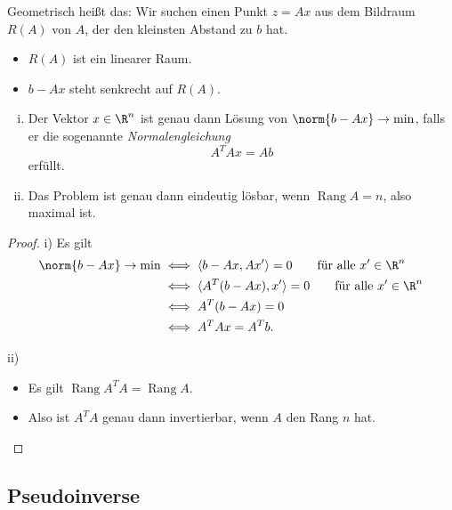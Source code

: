 \bigskip

Geometrisch heißt das: Wir suchen einen Punkt $z=Ax$ aus dem Bildraum $R(A)$ von $A$,
der den kleinsten Abstand zu $b$ hat.


\begin{itemize}
 \item $R(A)$ ist ein linearer Raum.
 \item $b-Ax$ steht senkrecht auf $R(A)$.
\end{itemize}

\begin{satz}
 \begin{enumerate}[i)]
 \item Der Vektor $x \in \R^n$ ist genau dann Lösung von $\norm{b-Ax} \to \min$, falls er die
 sogenannte \emph{Normalengleichung}
 \begin{equation*}
  A^TAx = Ab
 \end{equation*}
 erfüllt.

 \item Das Problem ist genau dann eindeutig lösbar, wenn $\operatorname{Rang} A = n$, also maximal ist.
 \end{enumerate}
\end{satz}

\begin{proof}
 i)  Es gilt
 \begin{align*}
  \norm{b-Ax} \to \min
  & \iff
  \langle b-Ax, Ax'\rangle = 0 \qquad \text{für alle $x' \in \R^n$} \\
  & \iff
  \langle A^T(b-Ax), x'\rangle = 0 \qquad \text{für alle $x' \in \R^n$} \\
  & \iff
  A^T(b-Ax) = 0 \\
  & \iff
  A^TAx = A^Tb.
 \end{align*}

 ii)
 \begin{itemize}
  \item Es gilt $\operatorname{Rang} A^T A = \operatorname{Rang} A$.
  \item Also ist $A^TA$ genau dann invertierbar, wenn $A$ den Rang $n$ hat.
  \qedhere
 \end{itemize}

\end{proof}

\subsection{Pseudoinverse}


